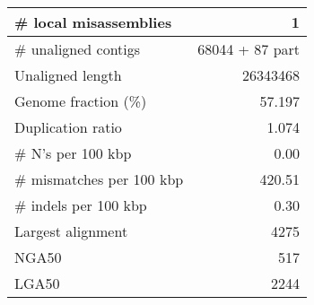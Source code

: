 \documentclass[12pt,a4paper]{article}
\begin{document}
\begin{table}[ht]
\begin{center}
\begin{tabular}{|l*{1}{|r}|}
\# local misassemblies & 1 \\ \hline
\# unaligned contigs & 68044 + 87 part \\ \hline
Unaligned length & 26343468 \\ \hline
Genome fraction (\%) & 57.197 \\ \hline
Duplication ratio & 1.074 \\ \hline
\# N's per 100 kbp & 0.00 \\ \hline
\# mismatches per 100 kbp & 420.51 \\ \hline
\# indels per 100 kbp & 0.30 \\ \hline
Largest alignment & 4275 \\ \hline
NGA50 & 517 \\ \hline
LGA50 & 2244 \\ \hline
\end{tabular}
\end{center}
\end{table}
\end{document}
